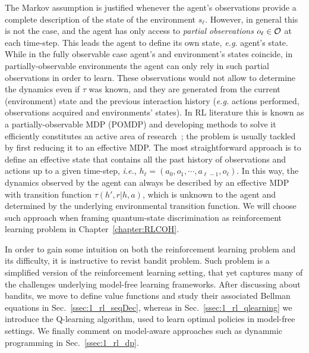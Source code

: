 The Markov assumption is justified whenever the agent's observations provide a complete description of the state of the environment $s_{\ell}$. However, in general this is not the case, and the agent has only access to \textit{partial observations} $o_{\ell}\in\mathcal{O}$ at each time-step. This leads the agent to define its own state, \textit{e.g.} agent's state. While in the fully observable case agent's and environment's states coincide, in partially-observable environments the agent can only rely in such partial observations in order to learn. These observations would not allow to determine the dynamics even if $\tau$ was known, and they are generated from the current (environment) state and the previous interaction history (\textit{e.g.} actions performed, observations acquired and environments' states). In RL literature this is known as a partially-observable MDP (POMDP) and developing methods to solve it efficiently constitutes an active area of research~\cite{Singh1994,Mnih2013,Shani2013,Egorov2015,Zhu2018}; the problem is usually tackled by first reducing it to an effective MDP. The most straightforward approach is to define an effective state that contains all the past history of observations and actions up to a given time-step, \textit{i.e.}, $h_{\ell}=(a_0,o_{1},\cdots,a_{\ell-1},o_\ell)$. In this way, the dynamics observed by the agent can always be described by an effective MDP with transition function $\tau(h',r|h,a)$, which is unknown to the agent and determined by the underlying environmental transition function. We will choose such approach when framing quantum-state discrimination as reinforcement learning problem in Chapter~\ref{chapter:RLCOH}.

In order to gain some intuition on both the reinforcement learning problem and its difficulty, it is instructive to revist bandit problem. Such problem is a simplified version of the reinforcement learning setting, that yet captures many of the challenges underlying model-free learning frameworks. After discussing about bandits, we move to define value functions and study their associated Bellman equations in Sec.~\ref{ssec:1_rl_seqDec}, whereas in Sec.~\ref{ssec:1_rl_qlearning} we introduce the Q-learning algorithm, used to learn optimal policies in model-free settings. We finally comment on model-aware approaches such as dynammic programming in Sec.~\ref{ssec:1_rl_dp}.%
